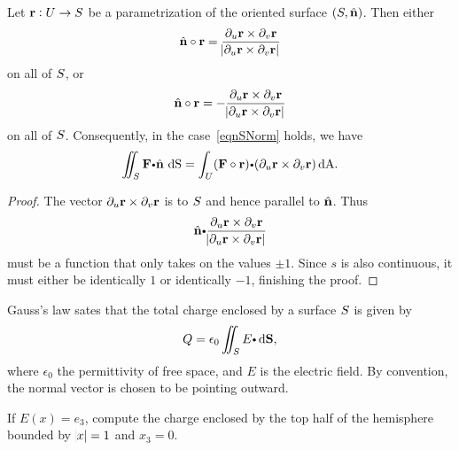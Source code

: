   \begin{proposition}
    Let $\mathbf{ r}:U \to S$ be a parametrization of the oriented surface $(S, \hat{ \mathbf{ n}})$.
    Then either
    \begin{equation}\label{eqnSNorm}
      \hat{ \mathbf{ n}} \circ \mathbf{ r}
	= \dfrac{\partial_u\mathbf{ r} \times \partial_v \mathbf{ r}}{\abs{\partial_u\mathbf{ r} \times \partial_v \mathbf{ r}}}
    \end{equation}
    on all of $S$, or
    \begin{equation}\label{eqnSNorm2}
      \hat{ \mathbf{ n}} \circ \mathbf{ r}
	= -\dfrac{\partial_u\mathbf{ r} \times \partial_v \mathbf{ r}}{\abs{\partial_u\mathbf{ r} \times \partial_v \mathbf{ r}}}
    \end{equation}
    on all of $S$.
    Consequently, in the case~\eqref{eqnSNorm} holds, we have
    \begin{equation}\label{eqnSintDef}
      \diint_\superficie \vector{F} \bp \hat{ \vector{n}} \,  \d \S
	= \dint_U
	  (\vector{F} \circ \vector{r})  \bp (\partial_u\vector{r} \times \partial_v \vector{r}) \, \dA.
    \end{equation}
  \end{proposition}
  \begin{proof}
  The vector  $\partial_u\mathbf{ r} \times \partial_v \mathbf{ r}$ is  to $S$ and hence parallel to $\hat{ \mathbf{ n}}$.
    Thus
    \begin{equation*}
      \hat{ \vector{n}} \bp \dfrac{\partial_u\vector{r} \times \partial_v \vector{r}}{\abs{\partial_u\vector{r} \times \partial_v \vector{r}}}
    \end{equation*}
    must be a function that only takes on the values $\pm 1$.
    Since $s$ is also continuous, it must either be identically $1$ or identically $-1$, finishing the proof.
  \end{proof}

  \begin{exa}
    Gauss's law sates that the total charge enclosed by a surface $S$ is given by
    \begin{equation*}
      Q = \epsilon_0 \diint_\superficie  E \bp  \d \vector{S},
    \end{equation*}
    where $\epsilon_0$ the permittivity of free space, and $E$ is the electric field.
    By convention, the normal vector is chosen to be pointing outward.

    If $E(x) = e_3$, compute the charge enclosed by the top half of the hemisphere bounded by $\abs{x}  = 1$ and $x_3  = 0$.
  \end{exa}



